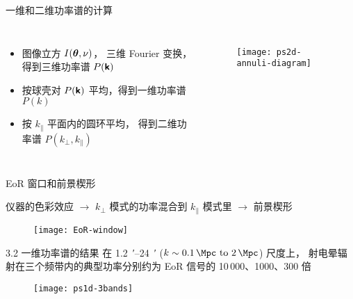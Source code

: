 \documentclass{beamer}
\begin{document}
\begin{frame}[t]
  \begin{alertblock}{一维和二维功率谱的计算}
  \end{alertblock}
  \begin{columns}
    \begin{itemize}
      \item \alert{图像立方} $I(\bm{\mathsf{\theta}}, \nu)$，
        三维 Fourier 变换，得到\alert{三维功率谱} $P(\bm{\mathsf{k}})$
      \item 按球壳对 $P(\bm{\mathsf{k}})$ 平均，得到\alert{一维功率谱} $P(k)$
      \item 按 $k_{\parallel}$ 平面内的圆环平均，
        得到\alert{二维功率谱} $P(k_{\perp}, k_{\parallel})$
    \end{itemize}

    \begin{figure}
      \centering
      \texttt{[image: ps2d-annuli-diagram]}
    \end{figure}
  \end{columns}
\end{frame}

\begin{frame}[t]
  \begin{alertblock}{EoR 窗口和前景楔形}
  \end{alertblock}
  仪器的色彩效应 $\rightarrow$
  $k_{\perp}$ 模式的功率混合到 $k_{\parallel}$ 模式里 $\rightarrow$
  前景楔形
  \begin{figure}
    \centering
    \texttt{[image: EoR-window]}
  \end{figure}
\end{frame}

\begin{frame}{3.2 一维功率谱的结果}
  在 \SI{1.2}{\arcminute}--\SI{24}{\arcminute}
  ($k \sim \SIrange{0.1}{2}{\per\Mpc}$) 尺度上，
  射电晕辐射在三个频带内的典型功率分别约为 EoR 信号的
  10\,000、1000、300 倍

  \begin{figure}
    \centering
    \texttt{[image: ps1d-3bands]}
  \end{figure}
\end{frame}
\end{document}
